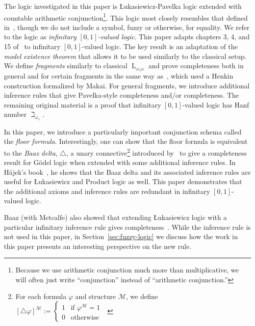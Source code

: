 \documentclass{amsart}
\theoremstyle{definition}
\numberwithin{equation}{theorem}
\renewcommand{\phi}{\varphi}
\newcommand{\baselang}{\operatorname{L}}
\newcommand{\lang}{\baselang_{\omega_1\omega}}
\newcommand{\luk}{{\L}ukasiewicz}
\begin{document}
The logic investigated in this paper is {\luk}-Pavelka logic extended with countable arithmetic conjunction\footnote{Because we use arithmetic conjunction much more than multiplicative, we will often just write ``conjunction'' instead of ``arithmetic conjunction.''}.
This logic most closely resembles that defined in~\cite{eagle2014omitting}, though we do not include a symbol, fuzzy or otherwise, for equality. We refer to the logic as \emph{infinitary $[0,1]$-valued logic}.
This paper adapts chapters 3, 4, and 15 of~\cite{keisler1971model} to infinitary $[0,1]$-valued logic.
The key result is an adaptation of the \emph{model existence theorem} that allows it to be used similarly to the classical setup.
We define \emph{fragments} similarly to classical $\lang$ and prove completeness both in general and for certain fragments in the same way as~\cite{keisler1971model}, which used a Henkin construction formalized by Makai.
For general fragments, we introduce additional inference rules that give Pavelka-style completeness and/or completeness.
The remaining original material is a proof that infinitary $[0,1]$-valued logic has Hanf number $\beth_{\omega_1}$.

In this paper, we introduce a particularly important conjunction schema called the \emph{floor formula}.
Interestingly, one can show that the floor formula is equivalent to the \emph{Baaz delta}, $\triangle$, a unary connective\footnote{For each formula $\phi$ and structure $\mathcal M$, we define $[\triangle\phi]^\mathcal M:=\left\{\begin{array}{ll}
    1&\text{if $\phi^\mathcal M=1$ }\\
    0&\text{otherwise}
  \end{array}\right.$}
introduced by~\cite{baaz1996infinite} to give a completeness result for G\"odel logic when extended with some additional inference rules.
In H\'ajek's book~\cite{hajek1998metamathematics}, he shows that the Baaz delta and its associated inference rules are useful for {\luk} and Product logic as well.
This paper demonstrates that the additional axioms and inference rules are redundant in infinitary $[0,1]$-valued logic.

Baaz (with Metcalfe) also showed that extending {\luk} logic with a particular infinitary inference rule gives completeness~\cite{baaz2007lukasiewicz}.
While the inference rule is not used in this paper, in Section~\ref{sec:fuzzy-logic} we discuss how the work in this paper presents an interesting perspective on the new rule.
\end{document}
